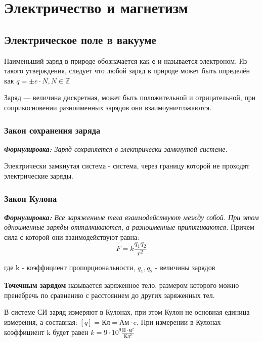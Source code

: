 \documentclass[../main.tex]{subfiles}
\begin{document}
\chapter{Электричество и магнетизм}

\section{Электрическое поле в вакууме}
Наименьший заряд в природе обозначается как \texttt{e} и называется электроном. Из такого утверждения, следует что любой заряд в природе может быть определён как  $ q = \pm e \cdot N, N \in \mathbb{Z}$

\vspace{5px}

Заряд --- величина дискретная, может быть положительной и отрицательной, при соприкосновении разноименных зарядов они взаимоуничтожаются.
\subsection{Закон сохранения заряда}
\textit{\textbf{Формулировка:} Заряд сохраняется в электрически замкнутой системе.}

 Электрически замкнутая система - система, через границу которой не проходят электрические заряды.

\subsection{Закон Кулона}
\textit{\textbf{Формулировка:} Все заряженные тела взаимодействуют между собой. При этом одноименные заряды отталкиваются, а разноименные притягиваются.}
Причем сила с которой они взаимодействуют равна:
\[ F = k\frac{q_1 q_2}{r^2}\]
\begin{center}
    где k - коэффициент пропорциональности,  $q_1,q_2$ - величины зарядов
\end{center}

 \textbf{Точечным зарядом} называется заряженное тело, размером которого можно пренебречь по сравнению с расстоянием до других заряженных тел.

\vspace{5px}

В системе СИ заряд измеряют в Кулонах, при этом Кулон не основная единица измерения, а составная: $[q] = \text{Кл} = \text{Ам} \cdot \text{c}$.
При измерении в Кулонах коэффициент k будет равен $k = 9 \cdot 10^9 \frac{\text{Н} \cdot \text{м}^2}{\text{Кл}^2}$
\end{document}
